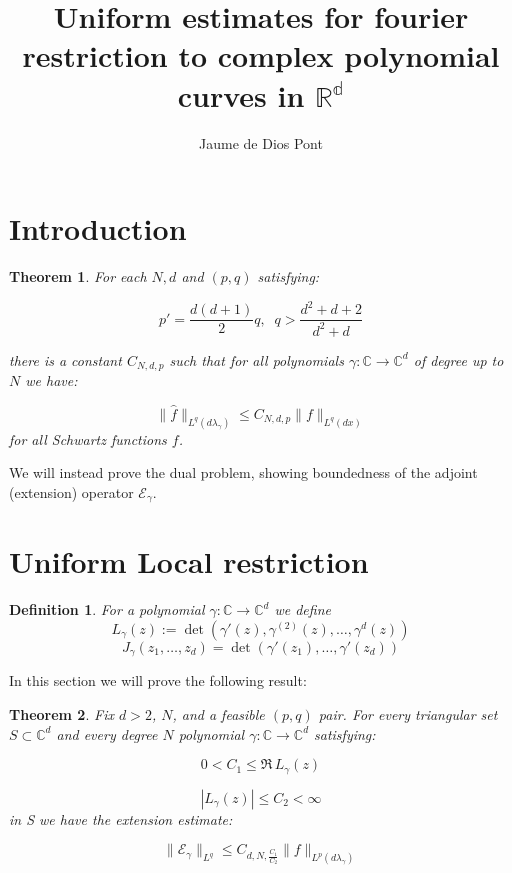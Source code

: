 \documentclass{article}
\title{Uniform estimates for fourier restriction to complex polynomial curves in $\mathbb{R^d}$}
\author{Jaume de Dios Pont}
\newtheorem{thm}{Theorem}
\newtheorem{defi}{Definition}
\begin{document}
	\maketitle

	\section{Introduction}
	\begin{thm}
		For each $N,d$ and $(p,q)$ satisfying:

		\begin{equation}
			p' = \frac{d(d+1)}{2} q, \;\; q> \frac{d^2+d+2}{d^2+d}
		\end{equation}

		there is a constant $C_{N,d,p}$ such that for all polynomials $\gamma: \mathbb C \to \mathbb C^d$ of degree up to $N$ we have:

		\begin{equation}
			\|\hat f\|_{L^q(d\lambda_\gamma)} \le C_{N,d,p} \|f\|_{L^q(dx)}
		\end{equation}
		for all Schwartz functions $f$.
	\end{thm}

	We will instead prove the dual problem, showing boundedness of the adjoint (extension) operator $\mathcal E_\gamma$.


\section{Uniform Local restriction}


\begin{defi}
	For a polynomial $\gamma: \mathbb C \to \mathbb C^d$ we define $$L_\gamma(z) := \det(\gamma'(z), \gamma^{(2)}(z), \dots,\gamma^{d}(z))$$ $$J_\gamma(z_1, \dots , z_d) = \det(\gamma'(z_1), \dots, \gamma'(z_d))$$
\end{defi}

In this section we will prove the following result:


\begin{thm}
	Fix $d>2$, $N$, and a feasible $(p,q)$ pair. For every triangular set $S\subset \mathbb C^d$ and every degree $N$ polynomial $\gamma: \mathbb C \to \mathbb C^d$ satisfying:

	\begin{equation}
		0 < C_1 \le \Re \, L_\gamma(z) 
	\end{equation}

	\begin{equation}
		|L_\gamma(z)| \le C_2 < \infty
	\end{equation}
	in S we have the extension estimate:

	\begin{equation}
		\|\mathcal E_\gamma \|_{L^q} \le C_{d,N, \frac {C_1}{C_2}}\|f\|_{L^p(d\lambda_\gamma)}
	\end{equation}
\end{thm}
\end{document}
